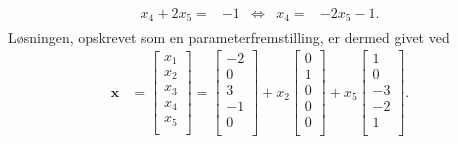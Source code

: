 \begin{eks}
\begin{align*}
\begin{array}{rrcll}
x_4+2x_5    =&-1   &\iff &x_4   =&-2x_5-1.
\end{array}
\end{align*}
%
Løsningen, opskrevet som en parameterfremstilling, er dermed givet ved
%
  \begin{align*}
    \mathbf{x} &= \begin{bmatrix}
           x_{1} \\
           x_{2} \\
           x_{3} \\
           x_{4} \\
           x_{5} \\
         \end{bmatrix} 
         = \begin{bmatrix}
           -2 \\
           0 \\
           3 \\
           -1 \\
           0 \\
         \end{bmatrix}
         +x_2 \begin{bmatrix}
           0 \\
           1 \\
           0 \\
           0 \\
           0 \\
         \end{bmatrix}
         +x_5 \begin{bmatrix}
           1 \\
           0 \\
           -3 \\
           -2 \\
           1 \\
         \end{bmatrix}.
  \end{align*} 
%
\label{eks_gauss}
%
%
\end{eks}
%
%
